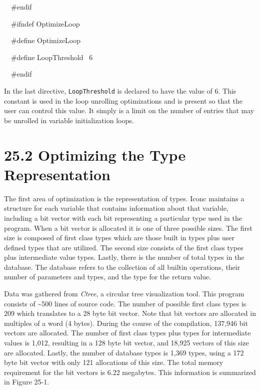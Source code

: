 {\ttfamily\mdseries
\ \ \#endif}


\bigskip

{\ttfamily\mdseries
\ \ \#ifndef OptimizeLoop}

{\ttfamily\mdseries
\ \ \#define OptimizeLoop}

{\ttfamily\mdseries
\ \ \#define LoopThreshold \ 6}

{\ttfamily\mdseries
\ \ \#endif}


In the last directive, \texttt{LoopThreshold} is declared to have the
value of 6. This constant is used in the loop unrolling optimizations
and is present so that the user can control this value. It simply is a
limit on the number of entries that may be unrolled in variable
initialization loops.


\section[25.2 Optimizing the Type Representation]{25.2 Optimizing the Type Representation}

The first area of optimization is the representation of types. Iconc
maintains a structure for each variable that contains information
about that variable, including a bit vector with each bit representing
a particular type used in the program. When a bit vector is allocated
it is one of three possible sizes. The first size is composed of first
class types which are those built in types plus user defined types
that are utilized. The second size consists of the first class types
plus intermediate value types. Lastly, there is the number of total
types in the database. The database refers to the collection of all
builtin operations, their number of parameters and types, and the type
for the return value.

Data was gathered from \textit{Ctree}, a circular tree visualization
tool. This program consists of \~{}500 lines of source code. The
number of possible first class types is 209 which translates to a 28
byte bit vector. Note that bit vectors are allocated in multiples of a
word (4 bytes). During the course of the compilation, 137,946 bit
vectors are allocated. The number of first class types plus types for
intermediate values is 1,012, resulting in a 128 byte bit vector, and
18,925 vectors of this size are allocated. Lastly, the number of
database types is 1,369 types, using a 172 byte bit vector with only
121 allocations of this size. The total memory requirement for the bit
vectors is 6.22 megabytes. This information is summarized in Figure
25-1.

